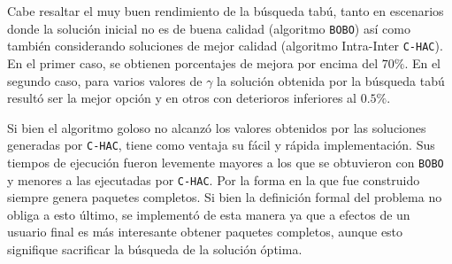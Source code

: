 Cabe resaltar el muy buen rendimiento de la búsqueda tabú, tanto en escenarios donde la solución inicial no es de buena calidad (algoritmo \texttt{BOBO}) así como también considerando soluciones de mejor calidad (algoritmo Intra-Inter \texttt{C-HAC}). En el primer caso, se obtienen porcentajes de mejora por encima del $70\%$. En el segundo caso, para varios valores de $\gamma$ la solución obtenida por la búsqueda tabú resultó ser la mejor opción y en otros con deterioros inferiores al $0.5\%$.

Si bien el algoritmo goloso no alcanzó los valores obtenidos por las soluciones generadas por \texttt{C-HAC}, tiene como ventaja su fácil y rápida implementación. Sus tiempos de ejecución fueron levemente mayores a los que se obtuvieron con \texttt{BOBO} y menores a las ejecutadas por \texttt{C-HAC}. Por la forma en la que fue construido siempre genera paquetes completos. Si bien la definición formal del problema no obliga a esto último, se implementó de esta manera ya que a efectos de un usuario final es más interesante obtener paquetes completos, aunque esto signifique sacrificar la búsqueda de la solución óptima.

\begin{table}[H]
\begin{center}
\caption{Comparación de calidad de soluciones entre algoritmos para la \hyperref[busqueda:articulos]{búsqueda de artículos}}
\end{center}
\end{table}

